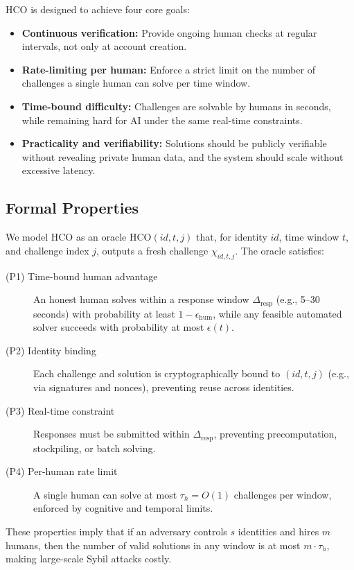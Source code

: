 \documentclass[sigconf,nonacm]{acmart}
\begin{document}
HCO is designed to achieve four core goals:
\begin{itemize}
	\item \textbf{Continuous verification:} Provide ongoing human checks at regular intervals, not only at account creation.
	\item \textbf{Rate-limiting per human:} Enforce a strict limit on the number of challenges a single human can solve per time window.
	\item \textbf{Time-bound difficulty:} Challenges are solvable by humans in seconds, while remaining hard for AI under the same real-time constraints.
	\item \textbf{Practicality and verifiability:} Solutions should be publicly verifiable without revealing private human data, and the system should scale without excessive latency.
\end{itemize}

\subsection{Formal Properties}

We model HCO as an oracle $\mathrm{HCO}(id,t,j)$ that, for identity $id$, time window $t$, and challenge index $j$, outputs a fresh challenge $\chi_{id,t,j}$. The oracle satisfies:

\begin{description}
	\item[(P1) Time-bound human advantage]
	An honest human solves within a response window $\Delta_{\mathrm{resp}}$ (e.g., 5--30 seconds) with probability at least $1-\epsilon_{\mathrm{hum}}$, while any feasible automated solver succeeds with probability at most $\epsilon(t)$.
	
	\item[(P2) Identity binding]
	Each challenge and solution is cryptographically bound to $(id,t,j)$ (e.g., via signatures and nonces), preventing reuse across identities.
	
	\item[(P3) Real-time constraint]
	Responses must be submitted within $\Delta_{\mathrm{resp}}$, preventing precomputation, stockpiling, or batch solving.
	
	\item[(P4) Per-human rate limit]
	A single human can solve at most $\tau_h = O(1)$ challenges per window, enforced by cognitive and temporal limits.
\end{description}

\noindent
These properties imply that if an adversary controls $s$ identities and hires $m$ humans, then the number of valid solutions in any window is at most $m \cdot \tau_h$, making large-scale Sybil attacks costly.
\end{document}
